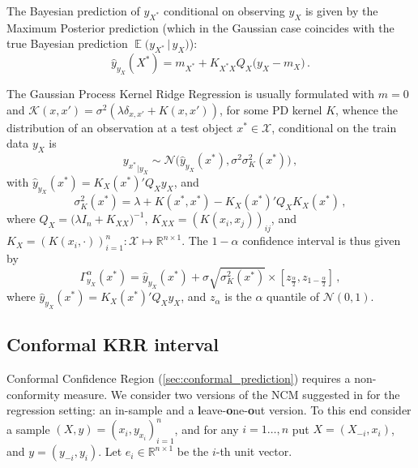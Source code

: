 \documentclass[a4paper,14pt]{extarticle}
\newcommand{\ex}{\mathop{\mathbb{E}}\nolimits}
\newcommand{\Ncal}{\mathcal{N}}
\newcommand{\Kcal}{\mathcal{K}}
\newcommand{\Xcal}{\mathcal{X}}
\newcommand{\Real}{\mathbb{R}}
\begin{document}
The Bayesian prediction of $y_{X^*}$ conditional on observing $y_X$ is given by
the Maximum Posterior prediction (which in the Gaussian case coincides with the
true Bayesian prediction $\ex\bigl(y_{X^*}\,|\, y_X\bigr)$):
\begin{equation*}
  \hat{y}_{y_X}(X^*) = m_{X^*} + K_{X^*X} Q_X \bigl(y_X - m_X\bigr) \,.
\end{equation*}

The Gaussian Process Kernel Ridge Regression is usually formulated with $m=0$ and
$\Kcal(x,x') = \sigma^2(\lambda \delta_{x,x'} + K(x,x'))$, for some PD kernel $K$,
whence the distribution of an observation at a test object $x^*\in \Xcal$, conditional
on the train data $y_X$ is
\begin{equation} \label{eq:gp_cond_dist}
{y_{x^*}}_{|y_X}
  \sim \Ncal\bigl( \hat{y}_{y_X}(x^*), \sigma^2 \sigma_K^2(x^*) \bigr) \,,
\end{equation}
with $\hat{y}_{y_X}(x^*) = K_X(x^*)' Q_X y_X$, and
\begin{equation*}
  \sigma_K^2(x^*)
    = \lambda + K(x^*, x^*) - K_X(x^*)' Q_X K_X(x^*) \,,
\end{equation*}
where $Q_X = \bigl(\lambda I_n + K_{XX}\bigr)^{-1}$, $K_{XX} = (K(x_i,x_j))_{ij}$,
and $K_X = (K(x_i, \cdot))_{i=1}^n: \Xcal \mapsto \Real^{n\times1}$. The $1-\alpha$
confidence interval is thus given by
\begin{equation} \label{eq:gp_conf_int}
\Gamma^\alpha_{y_X}(x^*)
  = \hat{y}_{y_X}(x^*)
  + \sigma \sqrt{\sigma_K^2(x^*)}
  \times [z_{\frac{\alpha}{2}}, z_{1-\frac{\alpha}{2}}]
  \,,
\end{equation}
where $\hat{y}_{y_X}(x^*) = K_X(x^*)' Q_X y_X$, and $z_\alpha$ is the $\alpha$
quantile of $\Ncal(0, 1)$.


\subsection{Conformal KRR interval} %
\label{sub:conformal_krr_interval}

Conformal Confidence Region (\ref{sec:conformal_prediction}) requires a non-conformity
measure. We consider two versions of the NCM suggested in \cite{vovk2005} for the
regression setting: an in-sample and a \textbf{l}eave-\textbf{o}ne-\textbf{o}ut version.
To this end consider a sample $(X, y) = (x_i, y_{x_i})_{i=1}^n$, and for any $i=1\ldots, n$
put $X = (X_{-i}, x_i)$, and $y = (y_{-i}, y_i)$. Let $e_i\in \Real^{n\times 1}$ be
the $i$-th unit vector.
\end{document}
